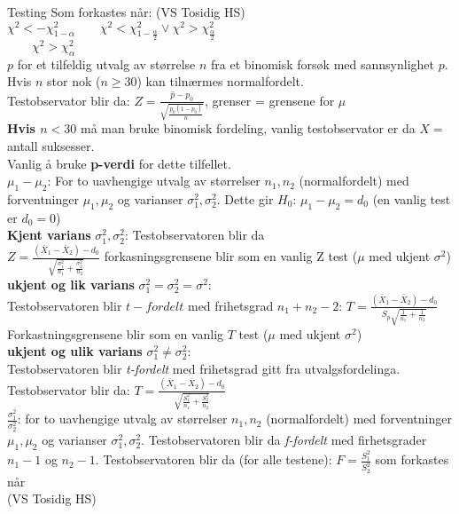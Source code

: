 \documentclass[final,hyperref={pdfpagelabels=false}]{beamer}
\begin{document}
\begin{frame}{}
\begin{columns}[t]
\begin{column}{.25\linewidth}
\begin{block}{\center\normalsize Testing}
{					Som forkastes når: (VS Tosidig HS)\\
					$\chi^2<-\chi^2_{1-\alpha}\qquad\chi^2<\chi^2_{1-\frac{\alpha}{2}}\vee\chi^2>\chi^2_\frac{\alpha}{2}$\\$ \qquad\chi^2>\chi^2_\alpha$\\
					$p$ for et tilfeldig utvalg av størrelse $n$ fra et binomisk forsøk med sannsynlighet $p$. Hvis $n$ stor nok ($n \geq 30$) kan tilnærmes normalfordelt.\\
					Testobservator blir da: $Z=\frac{\hat p - p_0}{\sqrt{\frac{p_0(1-p_0)}{n}}}$, grenser = grensene for $\mu$\\
					\textbf{Hvis $n<30$} må man bruke binomisk fordeling, vanlig testobservator er da $X=$ antall suksesser.\\
					Vanlig å bruke \textbf{p-verdi} for dette tilfellet.\\
					$\mu_1-\mu_2$: For to uavhengige utvalg av størrelser $n_1,n_2$ (normalfordelt) med forventninger $\mu_1,\mu_2$ og varianser $\sigma^2_1,\sigma_2^2$. Dette gir $H_0$: $\mu_1-\mu_2=d_0$ (en vanlig test er $d_0=0$)\\
					\textbf{Kjent varians} $\sigma_1^2,\sigma_2^2$: Testobservatoren blir da\\
					$Z=\frac{(\bar X_1-\bar X_2)-d_0}{\sqrt{\frac{\sigma_1^2}{n_1}+\frac{\sigma_2^2}{n_2}}}$ forkasningsgrensene blir som en vanlig Z test ($\mu$ med ukjent $\sigma^2$)\\
					\textbf{ukjent og lik varians} $\sigma_1^2=\sigma_2^2=\sigma^2$:\\
					Testobservatoren blir $t-fordelt$ med frihetsgrad $n_1 + n_2-2$:
					$T=\frac{(\bar X_1 - \bar X_2) - d_0}{S_p\sqrt{\frac{1}{n_1}+\frac{1}{n_2}}}$\\
					Forkastningsgrensene blir som en vanlig $T$ test ($\mu$ med ukjent $\sigma^2$)\\
					\textbf{ukjent og ulik varians} $\sigma_1^2\neq\sigma_2^2$:\\
					Testobservatoren blir \textit{t-fordelt} med frihetsgrad gitt fra utvalgsfordelinga. Testobservator blir da:
					$T=\frac{(\bar X_1 - \bar X_2) - d_0}{\sqrt{\frac{S_1^2}{n_1}+\frac{S_2^2}{n_2}}}$\\
					$\frac{\sigma_1^2}{\sigma_2^2}$: for to uavhengige utvalg av størrelser $n_1,n_2$ (normalfordelt) med forventninger $\mu_1,\mu_2$ og varianser $\sigma_1^2,\sigma_2^2$. Testobservatoren blir da \textit{f-fordelt} med firhetsgrader $n_1-1$ og $n_2-1$. Testobservatoren blir da (for alle testene): $F=\frac{S_1^2}{S_2^2}$ som forkastes når \\(VS Tosidig HS)\\
}
\end{block}
\end{column}
\end{columns}
\end{frame}
\end{document}
